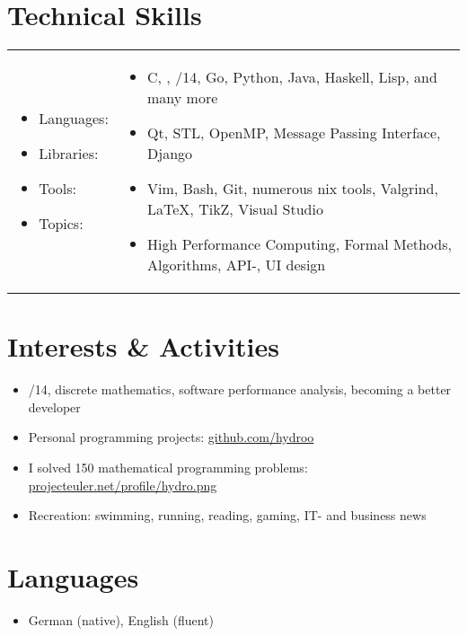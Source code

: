 \section*{Technical Skills}
\vspace{0.1cm} %
\begin{tabular}{l l}
	\begin{minipage}{0.18\textwidth}
		\begin{itemize}
			\item Languages:
			\item Libraries:
			\item Tools:
			\item Topics:
		\end{itemize}
	\end{minipage}
	&
	\begin{minipage}{0.80\textwidth}
		\begin{itemize}
			\item C, \cpp, \cpp11/14, Go, Python, Java, Haskell, Lisp, and many more
			\item Qt, STL, OpenMP, Message Passing Interface, Django
			\item Vim, Bash, Git, numerous \textasteriskcentered{}nix tools, Valgrind, \LaTeX, TikZ, Visual Studio
			\item High Performance Computing, Formal Methods, Algorithms, API-, UI design
		\end{itemize}
	\end{minipage}
\end{tabular}

\vspace{0.66cm} %

\pagebreak
\section*{Interests \& Activities}
\begin{itemize}
	\item {}/14, discrete mathematics, software performance analysis, becoming a better developer
	\item Personal programming projects: \href{https://github.com/hydroo}{github.com/hydroo}
	\item I solved 150 mathematical programming problems: \href{http://projecteuler.net/profile/hydro.png}{projecteuler.net/profile/hydro.png}
	\item Recreation: swimming, running, reading, gaming, IT- and business news
\end{itemize}

\customhrule
\section*{Languages}
\begin{itemize}
	\item German (native), English (fluent)
\end{itemize}


